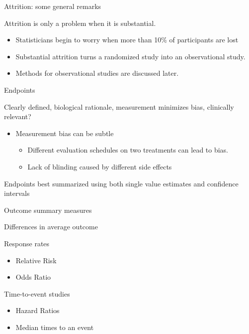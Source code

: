 \documentclass[ignorenonframetext,]{beamer}
\begin{document}
\begin{frame}{Attrition: some general remarks}

Attrition is only a problem when it is substantial.

\begin{itemize}
\item
  Statisticians begin to worry when more than 10\% of participants are
  lost
\item
  Substantial attrition turns a randomized study into an observational
  study.
\item
  Methods for observational studies are discussed later.
\end{itemize}

\end{frame}

\begin{frame}{Endpoints}

Clearly defined, biological rationale, measurement minimizes bias,
clinically relevant?

\begin{itemize}
\item
  Measurement bias can be subtle

  \begin{itemize}
  \item
    Different evaluation schedules on two treatments can lead to bias.
  \item
    Lack of blinding caused by different side effects
  \end{itemize}
\end{itemize}

Endpoints best summarized using both single value estimates and
confidence intervals

\end{frame}

\begin{frame}{Outcome summary measures}

Differences in average outcome

Response rates

\begin{itemize}
\item
  Relative Risk
\item
  Odds Ratio
\end{itemize}

Time-to-event studies

\begin{itemize}
\item
  Hazard Ratios
\item
  Median times to an event
\end{itemize}

\end{frame}
\end{document}
